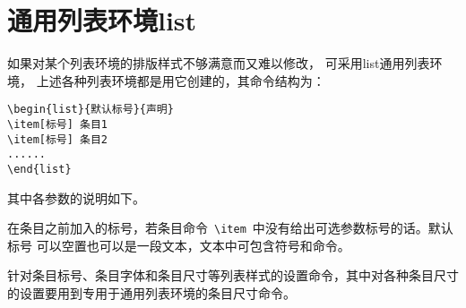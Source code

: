 \section{通用列表环境list}

如果对某个列表环境的排版样式不够满意而又难以修改，
可采用list通用列表环境，%
上述各种列表环境都是用它创建的，其命令结构为：

\begin{verbatim}
\begin{list}{默认标号}{声明}
\item[标号] 条目1
\item[标号] 条目2
......
\end{list}
\end{verbatim}

其中各参数的说明如下。



\noindent {}在条目之前加入的标号，若条目命令~\verb|\item|~中没有给出可选参数标号的话。默认标号 可以空置也可以是一段文本，文本中可包含符号和命令。

\noindent {}针对条目标号、条目字体和条目尺寸等列表样式的设置命令，其中对各种条目尺寸的设置要用到专用于通用列表环境的条目尺寸命令。

